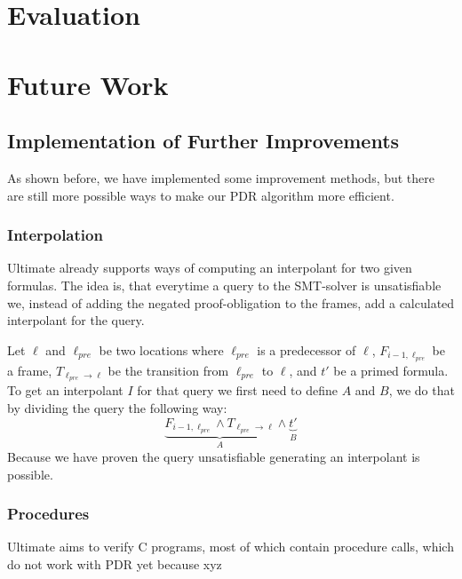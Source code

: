 \documentclass[11pt, a4paper, BCOR=10mm, ngerman, oneside]{scrbook}
\begin{document}
\chapter{Evaluation}


\chapter{Future Work}
\section{Implementation of Further Improvements}
As shown before, we have implemented some improvement methods, but there are still more possible ways to make our PDR algorithm more efficient.

\subsection{Interpolation}
Ultimate already supports ways of computing an interpolant for two given formulas. The idea is, that everytime a query to the SMT-solver is unsatisfiable we, instead of adding the negated proof-obligation to the frames, add a calculated interpolant for the query. \par
Let $\ell$ and $\ell_{pre}$ be two locations where $\ell_{pre}$ is a predecessor of $\ell$, $F_{i - 1, \ell_{pre}}$ be a frame, $T_{\ell_{pre} \rightarrow \ell}$ be the transition from $\ell_{pre}$ to $\ell$, and $t'$ be a primed formula. \\
To get an interpolant $I$ for that query we first need to define $A$ and $B$, we do that by dividing the query the following way:
\begin{equation*}
\underbrace{F_{i - 1, \ell_{pre}} \land T_{\ell_{pre} \rightarrow \ell}}_{A} \land \underbrace{t'}_B
\end{equation*}
Because we have proven the query unsatisfiable generating an interpolant is possible. \\

\subsection{Procedures}
Ultimate aims to verify C programs, most of which contain procedure calls, which do not work with PDR yet because xyz




\end{document}
